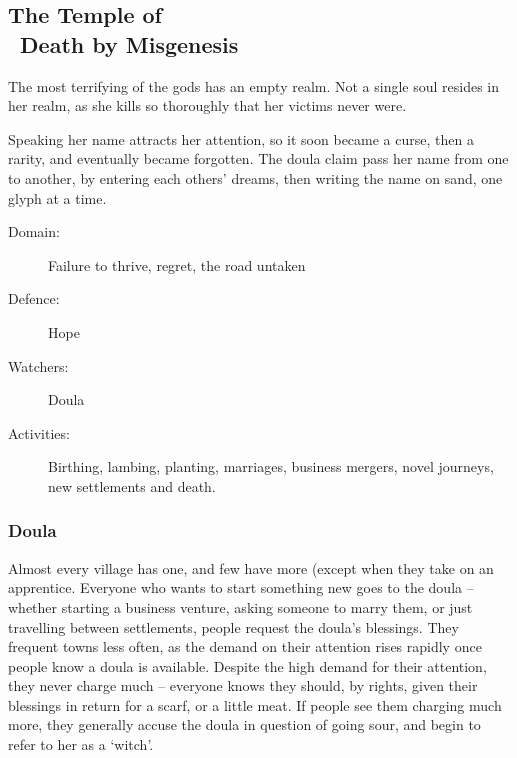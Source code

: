 \begin{multicols}{2}

\newcommand\guild[7]{
  \subsection[The Temple of #1]{The Temple of #1 \\ \textxswup~Death by #2~\textxswup}
  \ifdefmacro{#1}{}{\index{#1}}
  \index{#2 (God)}
  \ifdefmacro{#6}{}{\index{#6}}
  \index{Gods}


  \begin{exampletext}
  \noindent
  #3
  \end{exampletext}

  \noindent
  \begin{minipage}{\linewidth}
  \begin{description}
  \item[Domain:] #4

  \item[Defence:] #5

  \item[Watchers:] #6

  \item[Activities:] #7

  \end{description}
  \end{minipage}

  \subsubsection{#6}
}


\guild{\hphantom{Nemo}}%
  {Misgenesis}%
  {The most terrifying of the gods has an empty realm.
  Not a single soul resides in her realm, as she kills so thoroughly that her victims never were.

  Speaking her name attracts her attention, so it soon became a curse, then a rarity, and eventually became forgotten.
  The doula claim pass her name from one to another, by entering each others' dreams, then writing the name on sand, one glyph at a time.
  }%
  {Failure to thrive, regret, the road untaken}%
  {Hope}%
  {Doula}%
  {
    Birthing, lambing, planting, marriages, business mergers, novel journeys, new settlements and death.
  }%

  Almost every village has one, and few have more (except when they take on an apprentice.
  Everyone who wants to start something new goes to the doula -- whether starting a business venture, asking someone to marry them, or just travelling between settlements, people request the doula's blessings.
  They frequent towns less often, as the demand on their attention rises rapidly once people know a doula is available.
  Despite the high demand for their attention, they never charge much -- everyone knows they should, by rights, given their blessings in return for a scarf, or a little meat.
  If people see them charging much more, they generally accuse the doula in question of going sour, and begin to refer to her as a `witch'.


\end{multicols}

